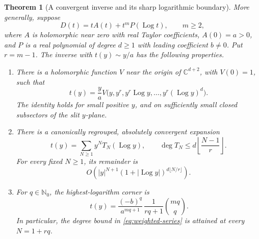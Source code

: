 \documentclass[11pt,a4paper]{article}
\numberwithin{equation}{section}
\newtheorem{theorem}{Theorem}[section]
\theoremstyle{definition}
\theoremstyle{remark}
\DeclareMathOperator{\Log}{Log}
\newcommand{\C}{\mathbb C}
\newcommand{\Nzero}{\mathbb N_0}
\begin{document}
\begin{theorem}[A convergent inverse and its sharp logarithmic boundary]
\label{thm:weighted-inverse}
More generally, suppose
\[
 D(t)=tA(t)+t^mP(\Log t),\qquad m\ge2,
\]
where \(A\) is holomorphic near zero with real Taylor coefficients,
\(A(0)=a>0\), and
\(P\) is a real polynomial of degree \(d\ge1\) with leading coefficient
\(b\ne0\).  Put \(r=m-1\).
The inverse with \(t(y)\sim y/a\) has the following properties.

\begin{enumerate}[label=(\roman*)]
\item There is a holomorphic function \(V\) near the origin of
\(\C^{d+2}\), with \(V(0)=1\), such that
\begin{equation}
 t(y)=\frac ya
 V\bigl(y,y^r,y^r\Log y,\ldots,y^r(\Log y)^d\bigr).
 \label{eq:weighted-lift}
\end{equation}
The identity holds for small positive \(y\), and on sufficiently small
closed subsectors of the slit \(y\)-plane.

\item There is a canonically regrouped, absolutely convergent expansion
\begin{equation}
 t(y)=\sum_{N\ge1}y^NT_N(\Log y),\qquad
 \deg T_N\le d\left\lfloor\frac{N-1}{r}\right\rfloor.
 \label{eq:weighted-series}
\end{equation}
For every fixed \(N\ge1\), its remainder is
\begin{equation}
 O\left(|y|^{N+1}
 (1+|\Log y|)^{d\lfloor N/r\rfloor}\right).
 \label{eq:weighted-rem}
\end{equation}

\item For \(q\in\Nzero\), the highest-logarithm corner is
\begin{equation}
 [y^{1+rq}(\Log y)^{dq}]\,t(y)
 =
 \frac{(-b)^q}{a^{mq+1}}\,
 \frac{1}{rq+1}\binom{mq}{q}.
 \label{eq:corner}
\end{equation}
In particular, the degree bound in \eqref{eq:weighted-series} is attained
at every \(N=1+rq\).
\end{enumerate}
\end{theorem}
\end{document}
